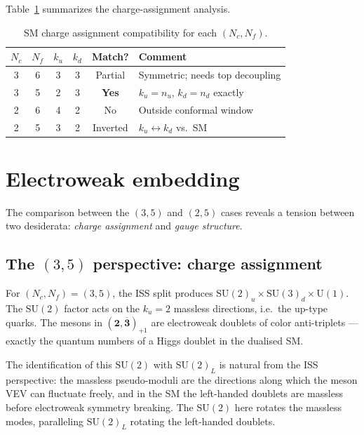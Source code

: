 \documentclass[11pt,a4paper]{article}
\newcommand{\Nf}{N_{\!f}}
\newcommand{\Nc}{N_{\!c}}
\newcommand{\rep}[1]{\mathbf{#1}}
\newcommand{\conjrep}[1]{\overline{\mathbf{#1}}}
\begin{document}
Table~\ref{tab:charges} summarizes the charge-assignment analysis.

\begin{table}[t]
\centering
\caption{SM charge assignment compatibility for each
  $(\Nc,\Nf)$.}
\label{tab:charges}
\smallskip
\begin{tabular}{@{}cccccl@{}}
\toprule
$\Nc$ & $\Nf$ & $k_u$ & $k_d$ & Match? & Comment \\
\midrule
3 & 6 & 3 & 3 & Partial &
  Symmetric; needs top decoupling \\
3 & 5 & 2 & 3 & \textbf{Yes} &
  $k_u = n_u$, $k_d = n_d$ exactly \\
2 & 6 & 4 & 2 & No &
  Outside conformal window \\
2 & 5 & 3 & 2 & Inverted &
  $k_u \leftrightarrow k_d$ vs.\ SM \\
\bottomrule
\end{tabular}
\end{table}


\section{Electroweak embedding}
\label{sec:ew}

The comparison between the $(3,5)$ and $(2,5)$ cases reveals a
tension between two desiderata: \emph{charge assignment} and
\emph{gauge structure}.

\subsection{The $(3,5)$ perspective: charge assignment}

For $(\Nc,\Nf) = (3,5)$, the ISS split produces
$\mathrm{SU}(2)_u \times \mathrm{SU}(3)_d \times \mathrm{U}(1)$.
The $\mathrm{SU}(2)$ factor acts on the $k_u = 2$ massless
directions, i.e.\ the up-type quarks.
The mesons in $(\rep{2},\conjrep{3})_{+1}$ are electroweak doublets
of color anti-triplets --- exactly the quantum numbers of a Higgs
doublet in the dualised SM.

The identification of this $\mathrm{SU}(2)$ with
$\mathrm{SU}(2)_L$ is natural from the ISS perspective: the
massless pseudo-moduli are the directions along which the meson VEV
can fluctuate freely, and in the SM the left-handed doublets are
massless before electroweak symmetry breaking.
The $\mathrm{SU}(2)$ here rotates the massless modes, paralleling
$\mathrm{SU}(2)_L$ rotating the left-handed doublets.
\end{document}
